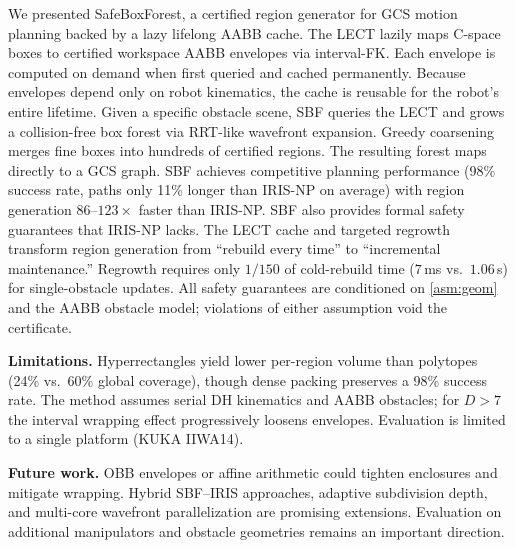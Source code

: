 \documentclass[letterpaper, conference]{IEEEtran}
\begin{document}
We presented SafeBoxForest, a certified region generator for GCS
motion planning backed by a lazy lifelong AABB cache.
The LECT lazily maps C-space boxes to certified
workspace AABB envelopes via interval-FK.
Each envelope is computed on demand when first queried and cached
permanently.
Because envelopes depend only on robot kinematics, the cache is
reusable for the robot's entire lifetime.
Given a specific obstacle scene, SBF queries the LECT and grows a
collision-free box forest via RRT-like wavefront expansion.
Greedy coarsening merges fine boxes into hundreds of certified regions.
The resulting forest maps directly to a GCS graph.
SBF achieves competitive planning performance
(98\% success rate, paths only 11\% longer than IRIS-NP on average)
with region generation $86$--$123\times$ faster than IRIS-NP.
SBF also provides formal safety guarantees that IRIS-NP lacks.
The LECT cache and targeted regrowth transform region generation
from ``rebuild every time'' to ``incremental maintenance.''
Regrowth requires only $1/150$ of cold-rebuild time
($7$\,ms vs.\ $1.06$\,s) for single-obstacle updates.
All safety guarantees are conditioned on \cref{asm:geom} and the
AABB obstacle model; violations of either assumption void the
certificate.

\textbf{Limitations.}
Hyperrectangles yield lower per-region volume than polytopes
(24\% vs.\ 60\% global coverage), though dense packing preserves
a 98\% success rate.
The method assumes serial DH kinematics and AABB obstacles;
for $D>7$ the interval wrapping effect progressively loosens envelopes.
Evaluation is limited to a single platform (KUKA IIWA14).

\textbf{Future work.}
OBB envelopes or affine arithmetic could tighten enclosures and
mitigate wrapping.
Hybrid SBF--IRIS approaches, adaptive subdivision depth, and
multi-core wavefront parallelization are promising extensions.
Evaluation on additional manipulators and obstacle geometries
remains an important direction.

\balance


\end{document}
